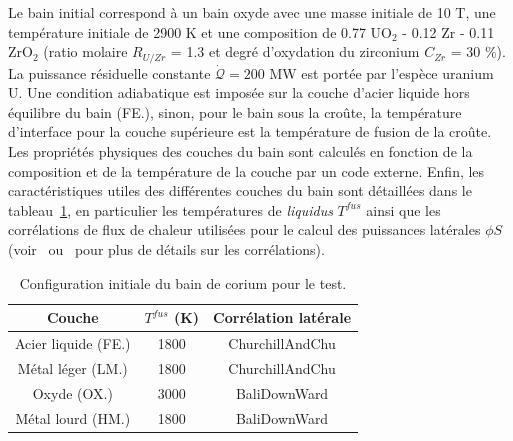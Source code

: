 Le bain initial correspond à un bain oxyde avec une masse initiale de 10 T, une température initiale de 2900 K et une composition de 0.77 UO$_2$ - 0.12 Zr - 0.11 ZrO$_2$ (ratio molaire $R_{U/Zr}$ = 1.3 et degré d'oxydation du zirconium $C_{Zr}$ = 30 \%). La puissance résiduelle constante $\dot{\mathcal{Q}} = 200$ MW est portée par l'espèce uranium U. Une condition adiabatique est imposée sur la couche d'acier liquide hors équilibre du bain (FE.), sinon, pour le bain sous la croûte, la température d'interface pour la couche supérieure est la température de fusion de la croûte. Les propriétés physiques des couches du bain sont calculés en fonction de la composition et de la température de la couche par un code externe. Enfin, les caractéristiques utiles des différentes couches du bain sont détaillées dans le tableau~\ref{tab:caracteristiques_couches_bain}, en particulier les températures de \textit{liquidus} $T^{fus}$ ainsi que les corrélations de flux de chaleur utilisées pour le calcul des puissances latérales $\phi S$ (voir~\cite{Bonnet1999} ou~\cite{Tourniaire2009a} pour plus de détails sur les corrélations).
\begin{table}
	\centering
	\begin{tabular}{ccc} 
	\hline
	Couche & $T^{fus}$ (K) & Corrélation latérale\\
	\hline
	Acier liquide (FE.) & 1800 & ChurchillAndChu\\
	Métal léger (LM.) & 1800 & ChurchillAndChu\\
	Oxyde (OX.) & 3000 & BaliDownWard\\
	Métal lourd (HM.) & 1800 & BaliDownWard\\
	\hline
	\end{tabular}	
	\caption{Configuration initiale du bain de corium pour le test.} 
	\label{tab:caracteristiques_couches_bain}
\end{table}

